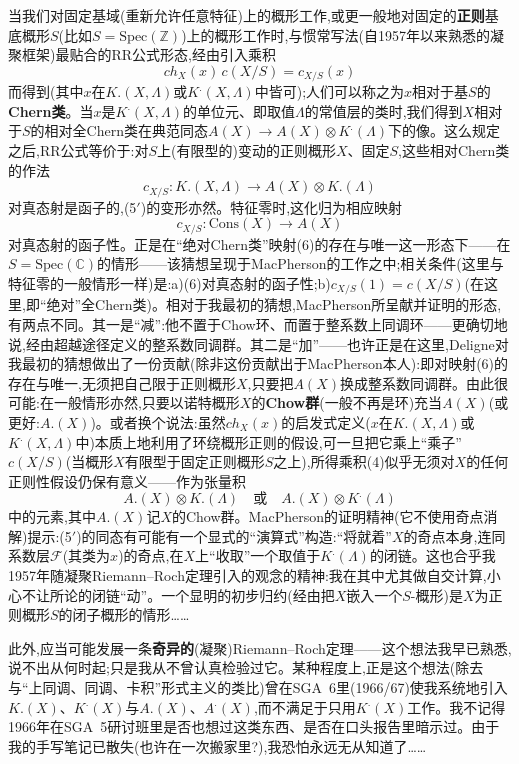当我们对固定基域(重新允许任意特征)上的概形工作,或更一般地对固定的\textbf{正则}基底概形$S$(比如$S=\mathrm{Spec}(\mathbb{Z})$)上的概形工作时,与惯常写法(自1957年以来熟悉的凝聚框架)最贴合的RR公式形态,经由引入乘积
$$ch_X(x)\, c(X/S) = c_{X/S}(x)$$
而得到(其中$x$在$K.(X,\Lambda)$或$K^.(X,\Lambda)$中皆可);人们可以称之为$x$相对于基$S$的\dmark{}\textbf{Chern类}。当$x$是$K^.(X,\Lambda)$的单位元、即取值$\Lambda$的常值层的类时,我们得到$X$相对于$S$的相对全Chern类在典范同态$A(X)\to A(X)\otimes K^.(\Lambda)$下的像。这么规定之后,RR公式等价于:对$S$上(有限型的)变动的正则概形$X$、固定$S$,这些相对Chern类的作法
$$c_{X/S}: K.(X,\Lambda)\to A(X)\otimes K.(\Lambda)$$
对真态射是函子的,(5$'$)的变形亦然。特征零时,这化归为相应映射
$$c_{X/S}: \mathrm{Cons}(X)\to A(X)$$
对真态射的函子性。正是在“绝对Chern类”映射(6)的存在与唯一这一形态下——在$S=\mathrm{Spec}(\mathbb{C})$的情形——该猜想呈现于MacPherson的工作之中;相关条件(这里与特征零的一般情形一样)是:a)(6)对真态射的函子性;b)$c_{X/S}(1)=c(X/S)$(在这里,即“绝对”全Chern类)。相对于我最初的猜想,MacPherson所呈献并证明的形态,有两点不同。其一是“减”:他不置于Chow环、而置于整系数上同调环——更确切地说,经由超越途径定义的整系数同调群。其二是“加”——也许正是在这里,Deligne对我最初的猜想做出了一份贡献(除非这份贡献出于MacPherson本人):即对映射(6)的存在与唯一,无须把自己限于正则概形$X$,只要把$A(X)$换成整系数同调群。由此很可能:在一般情形亦然,只要以诺特概形$X$的\textbf{Chow群}(一般不再是环)充当$A(X)$(或更好:$A.(X)$)。或者换个说法:虽然$ch_X(x)$的启发式定义($x$在$K.(X,\Lambda)$或$K^.(X,\Lambda)$中)本质上地利用了环绕概形正则的假设,可一旦把它乘上“乘子”$c(X/S)$(当概形$X$有限型于固定正则概形$S$之上),所得乘积(4)似乎无须对$X$的任何正则性假设仍保有意义\dmark{}——作为张量积
$$A.(X)\otimes K.(\Lambda) \quad\text{或}\quad A.(X)\otimes K^.(\Lambda)$$
中的元素,其中$A.(X)$记$X$的Chow群。MacPherson的证明精神(它不使用奇点消解)提示:(5$'$)的同态有可能有一个显式的“演算式”构造:“将就着”$X$的奇点本身,连同系数层$\mathcal{F}$(其类为$x$)的奇点,在$X$上“收取”一个取值于$K^.(\Lambda)$的闭链。这也合乎我1957年随凝聚Riemann--Roch定理引入的观念的精神:我在其中尤其做自交计算,小心不让所论的闭链“动”。一个显明的初步归约(经由把$X$嵌入一个$S$-概形)是$X$为正则概形$S$的闭子概形的情形……

此外,应当可能发展一条\textbf{奇异的}(凝聚)Riemann--Roch定理——这个想法我早已熟悉,说不出从何时起;只是我从不曾认真检验过它。某种程度上,正是这个想法(除去与“上同调、同调、卡积”形式主义的类比)曾在SGA~6里(1966/67)使我系统地引入$K.(X)$、$K^.(X)$与$A.(X)$、$A^.(X)$,而不满足于只用$K^.(X)$工作。我不记得1966年在SGA~5研讨班里是否也想过这类东西、是否在口头报告里暗示过。由于我的手写笔记已散失(也许在一次搬家里?),我恐怕永远无从知道了……

